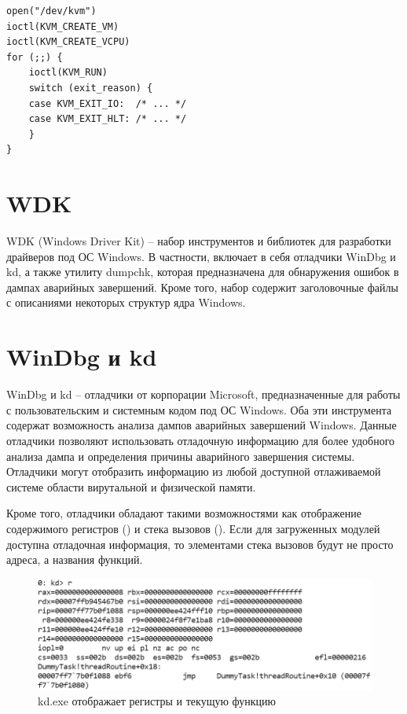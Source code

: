 \documentclass{mipt-thesis-bs}
\begin{document}
\begin{verbatim}
open("/dev/kvm")
ioctl(KVM_CREATE_VM)
ioctl(KVM_CREATE_VCPU)
for (;;) {
    ioctl(KVM_RUN)
    switch (exit_reason) {
    case KVM_EXIT_IO:  /* ... */
    case KVM_EXIT_HLT: /* ... */
    }
}
\end{verbatim}

\section*{WDK}

WDK (Windows Driver Kit) -- набор инструментов и библиотек для разработки драйверов под ОС Windows. В частности, включает в себя отладчики WinDbg и kd, а также утилиту dumpchk, которая предназначена для обнаружения ошибок в дампах аварийных завершений. Кроме того, набор содержит заголовочные файлы с описаниями некоторых структур ядра Windows.

\section*{WinDbg и kd}

WinDbg и kd -- отладчики от корпорации Microsoft, предназначенные для работы с пользовательским и системным кодом под ОС Windows. Оба эти инструмента содержат возможность анализа дампов аварийных завершений Windows. Данные отладчики позволяют использовать отладочную информацию для более удобного анализа дампа и определения причины аварийного завершения системы. Отладчики могут отобразить информацию из любой доступной отлаживаемой системе области вирутальной и физической памяти.

Кроме того, отладчики обладают такими возможностями как отображение содержимого регистров () и стека вызовов (). Если для загруженных модулей доступна отладочная информация, то элементами стека вызовов будут не просто адреса, а названия функций.

\begin{figure}[h]
\begin{center}
    \includegraphics[width=1\textwidth]{r.png}
    \caption{kd.exe отображает регистры и текущую функцию}
    \label{fig:kdr}
\end{center}
\end{figure}
\end{document}
